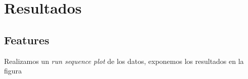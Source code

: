 \section{Resultados}\label{sec:resultados}

\subsection{Features}\label{subsec:features}
Realizamos un \textit{run sequence plot} de los datos, exponemos los resultados en la figura
